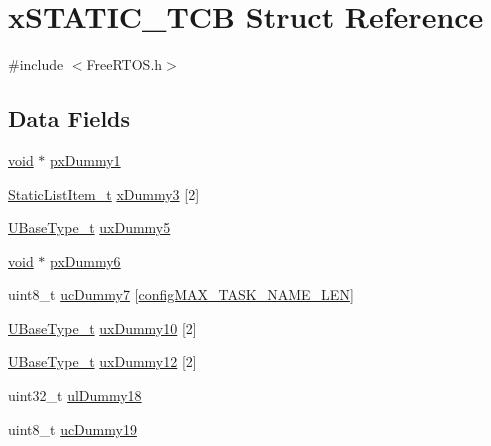 \hypertarget{structxSTATIC__TCB}{\section{x\-S\-T\-A\-T\-I\-C\-\_\-\-T\-C\-B Struct Reference}
\label{structxSTATIC__TCB}
}


{\ttfamily \#include $<$Free\-R\-T\-O\-S.\-h$>$}

\subsection*{Data Fields}
\begin{DoxyCompactItemize}
\item 
\hyperlink{Paradigm_2Tern__EE_2small_2portmacro_8h_a14d32f8130d3c0b212cfc751730b5b49}{void} $\ast$ \hyperlink{structxSTATIC__TCB_a2f66b620fdeb13f8969f27e1bbb4d1d1}{px\-Dummy1}
\item 
\hyperlink{FreeRTOS_8h_a1d31bc0472385a87424518da484d9e09}{Static\-List\-Item\-\_\-t} \hyperlink{structxSTATIC__TCB_a7f182aa8f5003494f63d975dabcb3ec1}{x\-Dummy3} \mbox{[}2\mbox{]}
\item 
\hyperlink{Flsh186_2prtmacro_8h_a8e88a5e44a5243b3d1c29af17fd6b5bd}{U\-Base\-Type\-\_\-t} \hyperlink{structxSTATIC__TCB_ab950bb498901ef7291e49086e5a2efd0}{ux\-Dummy5}
\item 
\hyperlink{Paradigm_2Tern__EE_2small_2portmacro_8h_a14d32f8130d3c0b212cfc751730b5b49}{void} $\ast$ \hyperlink{structxSTATIC__TCB_a416495e152e5caef64994f72329c60b0}{px\-Dummy6}
\item 
uint8\-\_\-t \hyperlink{structxSTATIC__TCB_a308771ccd6723cad777695d84a0a2a30}{uc\-Dummy7} \mbox{[}\hyperlink{FreeRTOSConfig_8h_ac388dc4041aab6997348828eb27fc1a8}{config\-M\-A\-X\-\_\-\-T\-A\-S\-K\-\_\-\-N\-A\-M\-E\-\_\-\-L\-E\-N}\mbox{]}
\item 
\hyperlink{Flsh186_2prtmacro_8h_a8e88a5e44a5243b3d1c29af17fd6b5bd}{U\-Base\-Type\-\_\-t} \hyperlink{structxSTATIC__TCB_ae5ff25c2fde1ad3c9a51bb45db81ac9f}{ux\-Dummy10} \mbox{[}2\mbox{]}
\item 
\hyperlink{Flsh186_2prtmacro_8h_a8e88a5e44a5243b3d1c29af17fd6b5bd}{U\-Base\-Type\-\_\-t} \hyperlink{structxSTATIC__TCB_a4ebf548878e48d8b5232d1b8a1f789ab}{ux\-Dummy12} \mbox{[}2\mbox{]}
\item 
uint32\-\_\-t \hyperlink{structxSTATIC__TCB_ade6781276f913dcd592ee0f6cce76c7e}{ul\-Dummy18}
\item 
uint8\-\_\-t \hyperlink{structxSTATIC__TCB_aa98151056a161f180013ae36dae0d17b}{uc\-Dummy19}
\end{DoxyCompactItemize}



